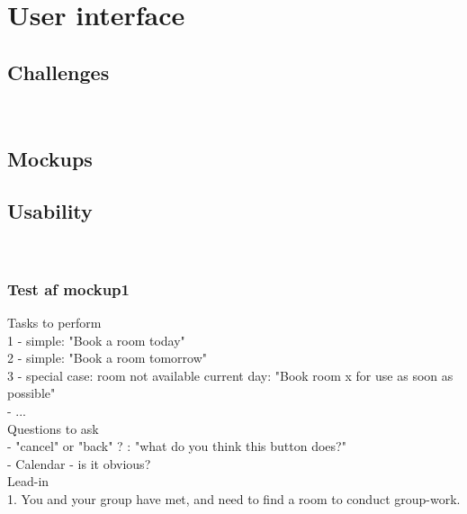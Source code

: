 \chapter{User interface}

\section{Challenges}
\\

\section{Mockups}

\section{Usability}
\\
\subsection{Test af mockup1}

Tasks to perform\\
1 - simple: "Book a room today" \\
2 - simple: "Book a room tomorrow" \\
3 - special case: room not available current day: "Book room x for use as soon as possible" \\
- ... \\


Questions to ask \\
- "cancel" or "back" ? : "what do you think this button does?" \\
- Calendar - is it obvious? \\


Lead-in \\
1.
You and your group have met, and need to find a room to conduct group-work.\\

